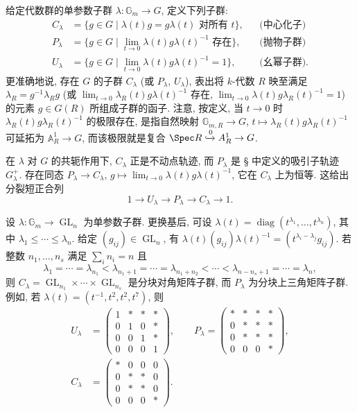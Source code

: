 \begin{definition}\label{src:B.1.27}
给定代数群的单参数子群 $\lambda:\mathbb G_m\to G$, 定义下列子群:
\[
\begin{aligned}
C_\lambda&=\{g\in G\mid\lambda(t)g=g\lambda(t)\text{ 对所有 }t\},&&\text{(中心化子)}\\
P_\lambda&=\{g\in G\mid\lim_{t\to0}\lambda(t)g\lambda(t)^{-1}\text{ 存在}\},&&\text{(抛物子群)}\\
U_\lambda&=\{g\in G\mid\lim_{t\to0}\lambda(t)g\lambda(t)^{-1}=1\},&&\text{(幺幂子群)}.
\end{aligned}
\]
更准确地说, 存在 $G$ 的子群 $C_\lambda$ (或 $P_\lambda$, $U_\lambda$), 表出将 $k$-代数 $R$ 映至满足 $\lambda_R=g^{-1}\lambda_Rg$ (或 $\lim_{t\to0}\lambda_R(t)g\lambda(t)^{-1}$ 存在, $\lim_{t\to0}\lambda(t)g\lambda_R(t)^{-1}=1$) 的元素 $g\in G(R)$ 所组成子群的函子. 注意, 按定义, 当 $t\to0$ 时 $\lambda_R(t)g\lambda_R(t)^{-1}$ 的极限存在, 是指自然映射 $\mathbb G_{m,R}\to G$, $t\mapsto\lambda_R(t)g\lambda_R(t)^{-1}$ 可延拓为 $\mathbb A_R^1\to G$, 而该极限就是复合 $\Spec R\xhookrightarrow{0}\mathbb A_R^1\to G$.

在 $\lambda$ 对 $G$ 的共轭作用下, $C_\lambda$ 正是不动点轨迹, 而 $P_\lambda$ 是 \S{} 中定义的吸引子轨迹 $G_\lambda^+$. 存在同态 $P_\lambda\to C_\lambda$, $g\mapsto\lim_{t\to0}\lambda(t)g\lambda(t)^{-1}$, 它在 $C_\lambda$ 上为恒等. 这给出分裂短正合列
\[
1\to U_\lambda\to P_\lambda\to C_\lambda\to1.
\]
\end{definition}
\begin{example}\label{src:B.1.28}
设 $\lambda:\mathbb G_m\to\operatorname{GL}_n$ 为单参数子群. 更换基后, 可设 $\lambda(t)=\operatorname{diag}(t^{\lambda_1},\ldots,t^{\lambda_n})$, 其中 $\lambda_1\le\cdots\le\lambda_n$. 给定 $(g_{ij})\in\operatorname{GL}_n$, 有 $\lambda(t)(g_{ij})\lambda(t)^{-1}=(t^{\lambda_i-\lambda_j}g_{ij})$. 若整数 $n_1,\ldots,n_s$ 满足 $\sum_i n_i=n$ 且
\[
\lambda_1=\cdots=\lambda_{n_1}<\lambda_{n_1+1}=\cdots=\lambda_{n_1+n_2}<\cdots<\lambda_{n-n_s+1}=\cdots=\lambda_n,
\]
则 $C_\lambda=\operatorname{GL}_{n_1}\times\cdots\times\operatorname{GL}_{n_s}$ 是分块对角矩阵子群, 而 $P_\lambda$ 为分块上三角矩阵子群. 例如, 若 $\lambda(t)=(t^{-1},t^2,t^2,t^7)$, 则
\[
\begin{aligned}
U_\lambda&=\begin{pmatrix}1&*&*&*\\0&1&0&*\\0&0&1&*\\0&0&0&1\end{pmatrix},\qquad
P_\lambda=\begin{pmatrix}*&*&*&*\\0&*&*&*\\0&*&*&*\\0&0&0&*\end{pmatrix},\\
C_\lambda&=\begin{pmatrix}*&0&0&0\\0&*&*&0\\0&*&*&0\\0&0&0&*\end{pmatrix}.
\end{aligned}
\]
\end{example}
